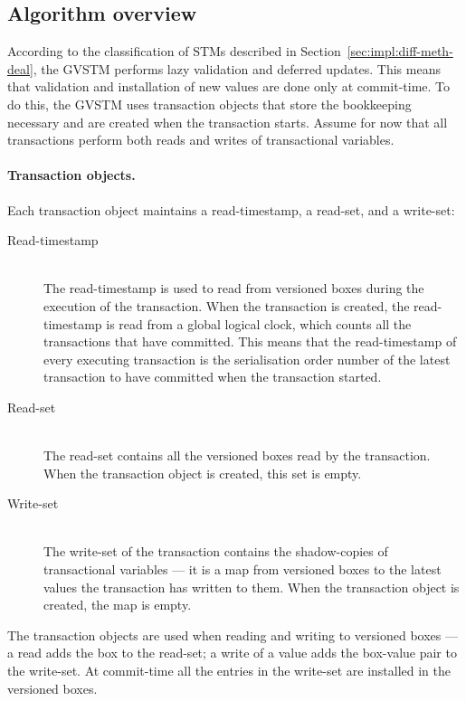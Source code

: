 \documentclass[12pt,a4paper,oneside,openright]{report}
\begin{document}
\subsection{Algorithm overview}
\label{sec:algorithm-overview}

According to the classification of STMs described in
Section~\ref{sec:impl:diff-meth-deal}, the GVSTM performs lazy
validation and deferred updates. This means that validation and
installation of new values are done only at commit-time. To do this,
the GVSTM uses transaction objects that store the bookkeeping
necessary and are created when the transaction starts. Assume for now
that all transactions perform both reads and writes of transactional
variables.

\paragraph{Transaction objects.} Each transaction object maintains a
read-timestamp, a read-set, and a write-set:

\begin{description}
\item[Read-timestamp] \hfill\\
  The read-timestamp is used to read from versioned boxes during the
  execution of the transaction. When the transaction is created, the
  read-timestamp is read from a global logical clock, which counts all
  the transactions that have committed. This means that the
  read-timestamp of every executing transaction is the serialisation
  order number of the latest transaction to have committed when the
  transaction started.
\item[Read-set] \hfill\\
  The read-set contains all the versioned boxes read by the
  transaction. When the transaction object is created, this set is
  empty.
\item[Write-set] \hfill\\
  The write-set of the transaction contains the shadow-copies of
  transactional variables --- it is a map from versioned boxes to the
  latest values the transaction has written to them. When the
  transaction object is created, the map is empty.
\end{description}
The transaction objects are used when reading and writing to versioned
boxes --- a read adds the box to the read-set; a write of a value adds
the box-value pair to the write-set. At commit-time all the entries in
the write-set are installed in the versioned boxes.
\end{document}
